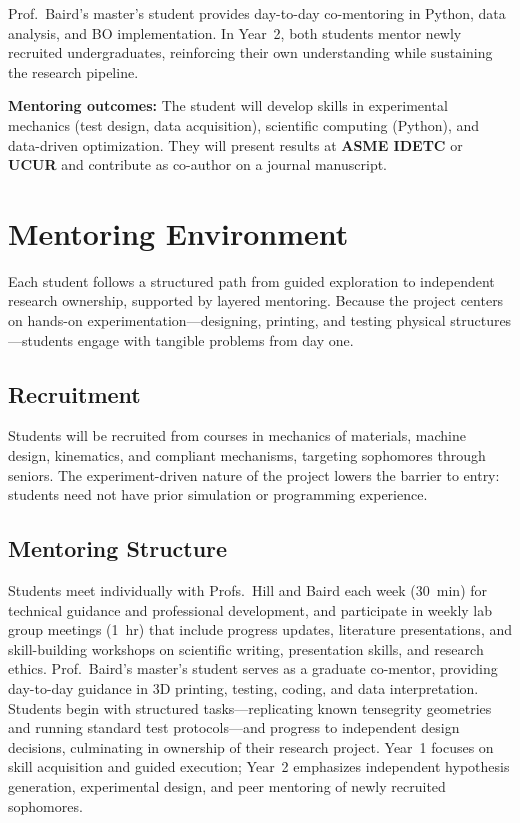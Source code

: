 \documentclass[11pt]{article}
\begin{document}
Prof.~Baird's master's student provides day-to-day co-mentoring in Python,
data analysis, and BO implementation.
In Year~2, both students mentor newly recruited undergraduates, reinforcing
their own understanding while sustaining the research pipeline.

\textbf{Mentoring outcomes:} The student will develop skills in experimental
mechanics (test design, data acquisition), scientific computing (Python),
and data-driven optimization.  They will present results at \textbf{ASME IDETC}
or \textbf{UCUR} and contribute as co-author on a journal manuscript.

\section{Mentoring Environment}
\label{sec:mentoring}

Each student follows a structured path from guided exploration
to independent research ownership, supported by layered mentoring.
Because the project centers on hands-on experimentation---designing,
printing, and testing physical structures---students engage with tangible
problems from day one.

\subsection*{Recruitment}

Students will be recruited from courses in mechanics of materials, machine
design, kinematics, and compliant mechanisms, targeting sophomores through
seniors.  The experiment-driven nature of the project lowers the barrier to
entry: students need not have prior simulation or programming experience.

\subsection*{Mentoring Structure}

Students meet individually with Profs.~Hill and Baird each week (30~min) for
technical guidance and professional development, and participate in weekly lab
group meetings (1~hr) that include progress updates, literature
presentations, and skill-building workshops on scientific writing,
presentation skills, and research ethics.  Prof.~Baird's master's student
serves as a graduate co-mentor, providing day-to-day guidance in 3D printing,
testing, coding, and data interpretation.
Students begin with structured tasks---replicating known tensegrity
geometries and running standard test protocols---and progress to independent
design decisions, culminating in ownership of their research project. Year~1 focuses on skill acquisition and guided execution; Year~2 emphasizes independent hypothesis generation, experimental design, and peer mentoring of newly recruited sophomores.
\end{document}
